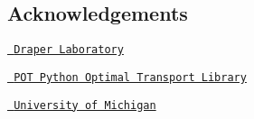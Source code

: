 \subsection*{Acknowledgements}


\begin{DoxyItemize}
\item \href{https://www.draper.com}{\texttt{ Draper Laboratory}}
\item \href{https://github.com/rflamary/POT}{\texttt{ P\+OT Python Optimal Transport Library}}
\item \href{https://aero.engin.umich.edu}{\texttt{ University of Michigan}} 
\end{DoxyItemize}